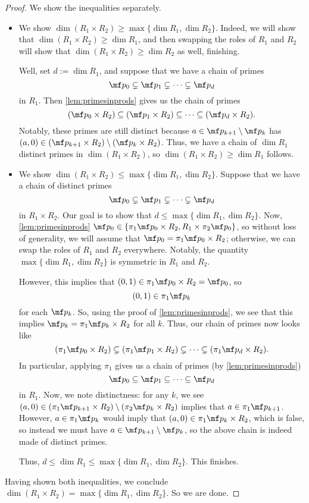 \begin{proof}
	We show the inequalities separately.
	\begin{itemize}
		\item We show $\dim(R_1\times R_2)\ge\max\{\dim R_1,\dim R_2\}$. Indeed, we will show that $\dim(R_1\times R_2)\ge\dim R_1$, and then swapping the roles of $R_1$ and $R_2$ will show that $\dim(R_1\times R_2)\ge\dim R_2$ as well, finishing.

		Well, set $d:=\dim R_1$, and suppose that we have a chain of primes
		\[\mf p_0\subsetneq\mf p_1\subsetneq\cdots\subsetneq\mf p_d\]
		in $R_1$. Then \autoref{lem:primesinprods} gives us the chain of primes
		\[(\mf p_0\times R_2)\subseteq(\mf p_1\times R_2)\subseteq\cdots\subseteq(\mf p_d\times R_2).\]
		Notably, these primes are still distinct because $a\in\mf p_{k+1}\setminus\mf p_k$ has $(a,0)\in(\mf p_{k+1}\times R_2)\setminus(\mf p_k\times R_2)$. Thus, we have a chain of $\dim R_1$ distinct primes in $\dim(R_1\times R_2)$, so $\dim(R_1\times R_2)\ge\dim R_1$ follows.
		
		\item We show $\dim(R_1\times R_2)\le\max\{\dim R_1,\dim R_2\}$. Suppose that we have a chain of distinct primes
		\[\mf p_0\subsetneq\mf p_1\subsetneq\cdots\subsetneq\mf p_d\]
		in $R_1\times R_2$. Our goal is to show that $d\le\max\{\dim R_1,\dim R_2\}$. Now, \autoref{lem:primesinprods} $\mf p_0\in\{\pi_1\mf p_0\times R_2,R_1\times\pi_2\mf p_0\}$, so without loss of generality, we will assume that $\mf p_0=\pi_1\mf p_0\times R_2$; otherwise, we can swap the roles of $R_1$ and $R_2$ everywhere. Notably, the quantity $\max\{\dim R_1,\dim R_2\}$ is symmetric in $R_1$ and $R_2$.

		However, this implies that $(0,1)\in\pi_1\mf p_0\times R_2=\mf p_0$, so
		\[(0,1)\in\pi_1\mf p_k\]
		for each $\mf p_k$. So, using the proof of \autoref{lem:primesinprods}, we see that this implies $\mf p_k=\pi_1\mf p_k\times R_2$ for all $k$. Thus, our chain of primes now looks like
		\[(\pi_1\mf p_0\times R_2)\subsetneq(\pi_1\mf p_1\times R_2)\subsetneq\cdots\subsetneq(\pi_1\mf p_d\times R_2).\]
		In particular, applying $\pi_1$ gives us a chain of primes (by \autoref{lem:primesinprods})
		\[\mf p_0\subseteq\mf p_1\subseteq\cdots\subseteq\mf p_d\]
		in $R_1$. Now, we note distinctness: for any $k$, we see $(a,0)\in(\pi_1\mf p_{k+1}\times R_2)\setminus(\pi_2\mf p_k\times R_2)$ implies that $a\in\pi_1\mf p_{k+1}$. However, $a\in\pi_1\mf p_k$ would imply that $(a,0)\in\pi_1\mf p_k\times R_2$, which is false, so instead we must have $a\in\mf p_{k+1}\setminus\mf p_k$, so the above chain is indeed made of distinct primes.

		Thus, $d\le\dim R_1\le\max\{\dim R_1,\dim R_2\}$. This finishes.
	\end{itemize}
	Having shown both inequalities, we conclude $\dim(R_1\times R_2)=\max\{\dim R_1,\dim R_2\}$. So we are done.
\end{proof}
